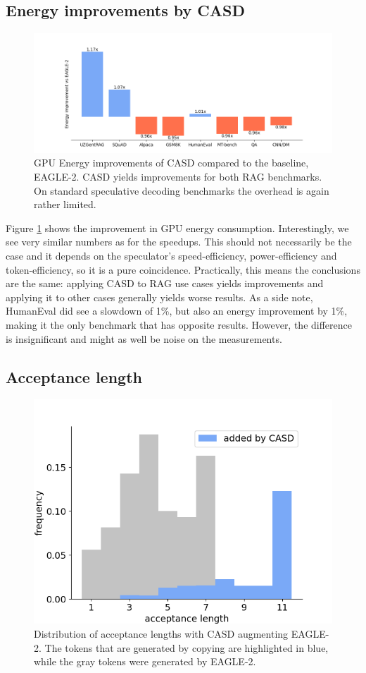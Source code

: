 \subsection{Energy improvements by CASD}
\begin{figure}[h]
  \centering
  \includegraphics[width=\linewidth]{fig/energy_vs_eagle.png}
  \caption{GPU Energy improvements of CASD compared to the baseline, EAGLE-2. CASD yields improvements for both RAG benchmarks. On standard speculative decoding benchmarks the overhead is again rather limited.}
  \label{fig:energy_vs_eagle}
\end{figure}

Figure \ref{fig:energy_vs_eagle} shows the improvement in GPU energy consumption. Interestingly, we see very similar numbers as for the speedups. This should not necessarily be the case and it depends on the speculator's speed-efficiency, power-efficiency and token-efficiency, so it is a pure coincidence. Practically, this means the conclusions are the same: applying CASD to RAG use cases yields improvements and applying it to other cases generally yields worse results. As a side note, HumanEval did see a slowdown of 1\%, but also an energy improvement by 1\%, making it the only benchmark that has opposite results. However, the difference is insignificant and might as well be noise on the measurements.

\subsection{Acceptance length}
\begin{figure}[h]
  \centering
  \includegraphics[width=0.7\linewidth]{fig/acceptance_length.png}
  \caption{Distribution of acceptance lengths with CASD augmenting EAGLE-2. The tokens that are generated by copying are highlighted in blue, while the gray tokens were generated by EAGLE-2.}
  \label{fig:acceptance_length}
\end{figure}

